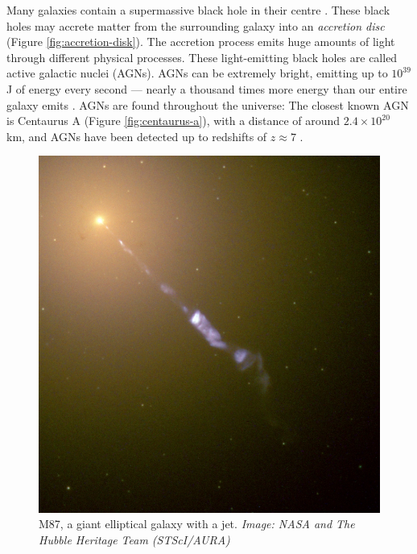         Many galaxies contain a supermassive black hole in their centre
        \citep{richstone98}. These black holes may accrete matter from the
        surrounding galaxy into an \emph{accretion disc} (Figure
        \ref{fig:accretion-disk}). The accretion process emits huge amounts of
        light through different physical processes. These light-emitting black
        holes are called active galactic nuclei (AGNs). AGNs can be extremely
        bright, emitting up to $10^{39}$ J of energy every second --- nearly a
        thousand times more energy than our entire galaxy emits
        \citep{begelman84}. AGNs are found throughout the universe: The closest
        known AGN is Centaurus A (Figure \ref{fig:centaurus-a}), with a distance
        of around $2.4 \times 10^{20}$ km, and AGNs have been detected up to
        redshifts of $z \approx 7$ \citeme {}.

        \begin{figure}
            \centering
            \includegraphics[height=0.3\textheight]{images/M87_jet.jpg}
            \caption{M87, a giant elliptical galaxy with a jet. \emph{Image:
                NASA and The Hubble Heritage Team (STScI/AURA)}}
            \label{fig:m87}
        \end{figure}

